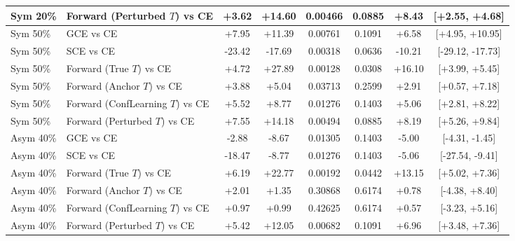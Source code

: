 \documentclass[10pt,twocolumn]{article}
\theoremstyle{definition}
\begin{document}
\begin{table}[h]
\begin{tabular}{llcccccc}
Sym 20\% & Forward (Perturbed $T$) vs CE & +3.62 & +14.60 & 0.00466 & 0.0885 & +8.43 & [+2.55, +4.68] \\
\midrule
Sym 50\% & GCE vs CE & +7.95 & +11.39 & 0.00761 & 0.1091 & +6.58 & [+4.95, +10.95] \\
Sym 50\% & SCE vs CE & -23.42 & -17.69 & 0.00318 & 0.0636 & -10.21 & [-29.12, -17.73] \\
Sym 50\% & Forward (True $T$) vs CE & +4.72 & +27.89 & 0.00128 & 0.0308 & +16.10 & [+3.99, +5.45] \\
Sym 50\% & Forward (Anchor $T$) vs CE & +3.88 & +5.04 & 0.03713 & 0.2599 & +2.91 & [+0.57, +7.18] \\
Sym 50\% & Forward (ConfLearning $T$) vs CE & +5.52 & +8.77 & 0.01276 & 0.1403 & +5.06 & [+2.81, +8.22] \\
Sym 50\% & Forward (Perturbed $T$) vs CE & +7.55 & +14.18 & 0.00494 & 0.0885 & +8.19 & [+5.26, +9.84] \\
\midrule
Asym 40\% & GCE vs CE & -2.88 & -8.67 & 0.01305 & 0.1403 & -5.00 & [-4.31, -1.45] \\
Asym 40\% & SCE vs CE & -18.47 & -8.77 & 0.01276 & 0.1403 & -5.06 & [-27.54, -9.41] \\
Asym 40\% & Forward (True $T$) vs CE & +6.19 & +22.77 & 0.00192 & 0.0442 & +13.15 & [+5.02, +7.36] \\
Asym 40\% & Forward (Anchor $T$) vs CE & +2.01 & +1.35 & 0.30868 & 0.6174 & +0.78 & [-4.38, +8.40] \\
Asym 40\% & Forward (ConfLearning $T$) vs CE & +0.97 & +0.99 & 0.42625 & 0.6174 & +0.57 & [-3.23, +5.16] \\
Asym 40\% & Forward (Perturbed $T$) vs CE & +5.42 & +12.05 & 0.00682 & 0.1091 & +6.96 & [+3.48, +7.36] \\
\bottomrule
\end{tabular}
\end{table}
\end{document}

